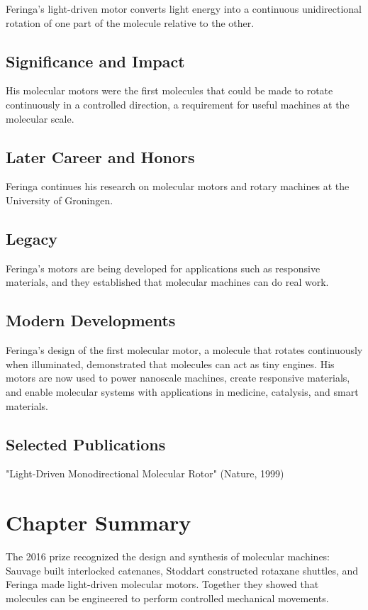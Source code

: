 Feringa's light-driven motor converts light energy into a continuous unidirectional rotation of one part of the molecule relative to the other.

\subsection*{Significance and Impact}

His molecular motors were the first molecules that could be made to rotate continuously in a controlled direction, a requirement for useful machines at the molecular scale.

\subsection*{Later Career and Honors}

Feringa continues his research on molecular motors and rotary machines at the University of Groningen.

\subsection*{Legacy}

Feringa's motors are being developed for applications such as responsive materials, and they established that molecular machines can do real work.

\subsection*{Modern Developments}

Feringa's design of the first molecular motor, a molecule that rotates continuously when illuminated, demonstrated that molecules can act as tiny engines. His motors are now used to power nanoscale machines, create responsive materials, and enable molecular systems with applications in medicine, catalysis, and smart materials.

\subsection*{Selected Publications}

"Light-Driven Monodirectional Molecular Rotor" (Nature, 1999)

\clearpage

\section*{Chapter Summary}

The 2016 prize recognized the design and synthesis of molecular machines: Sauvage built interlocked catenanes, Stoddart constructed rotaxane shuttles, and Feringa made light-driven molecular motors. Together they showed that molecules can be engineered to perform controlled mechanical movements.
